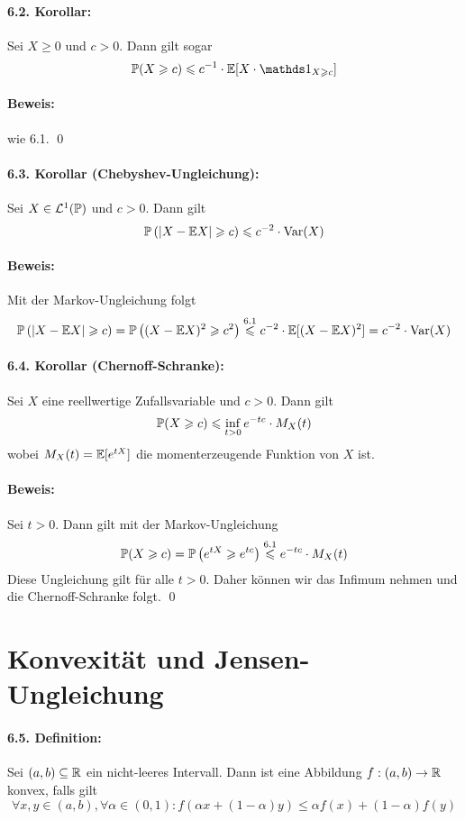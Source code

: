 \documentclass[12pt]{report}
\begin{document}
\paragraph{6.2. Korollar:}Sei $X\geq 0$ und $c>0$. Dann gilt sogar
$$\Pp(X\geq c)\leq c^{-1}\cdot\E[X\cdot\ind{X\geq c}]$$

\paragraph{Beweis:}wie 6.1. \qed

\paragraph{6.3. Korollar (Chebyshev-Ungleichung):}Sei $X\in\mathcal{L}^1(\mathbb{P})$ und $c>0$. Dann gilt
$$\mathbb{P}\left(|X-\mathbb{E} X|\geqslant c\right)\leqslant c^{-2}\cdot\operatorname{Var}(X)$$
 
 \paragraph{Beweis:} Mit der Markov-Ungleichung folgt
 $$\mathbb{P}\left(|X-\mathbb{E} X|\geqslant c\right)=\mathbb{P}\left((X-\mathbb{E} X)^2\geqslant c^2\right)\overset{6.1}{\leqslant}c^{-2}\cdot\mathbb{E}[(X-\mathbb{E} X)^2]=c^{-2}\cdot\operatorname{Var}(X)$$
 
 \paragraph{6.4. Korollar (Chernoff-Schranke):}Sei $X$ eine reellwertige Zufallsvariable und $c>0$. Dann gilt
 $$\mathbb{P}(X\geqslant c)\leqslant\inf_{t>0}e^{-tc}\cdot M_X(t)$$
 wobei $M_X(t)=\mathbb{E}[e^{tX}]$ die momenterzeugende Funktion von $X$ ist.
 
 \paragraph{Beweis:} Sei $t>0$. Dann gilt mit der Markov-Ungleichung
 $$\mathbb{P}(X\geqslant c)=\mathbb{P}\left(e^{tX}\geqslant e^{tc}\right)\overset{6.1}{\leqslant}e^{-tc}\cdot M_X(t)$$
 Diese Ungleichung gilt f\"ur alle $t>0$. Daher k\"onnen wir das Infimum nehmen und die Chernoff-Schranke folgt. \qed
 
 \section*{Konvexit\"at und Jensen-Ungleichung}
 
 \paragraph{6.5. Definition:}Sei $(a,b)\subseteq\mathbb{R}$ ein nicht-leeres Intervall. Dann ist eine Abbildung $f:(a,b)\to\mathbb{R}$ konvex, falls gilt
 $$\forall x,y\in(a,b),\forall\alpha\in(0,1):f(\alpha x+(1-\alpha)y)\leq\alpha f(x)+(1-\alpha)f(y)$$
 
\end{document}
